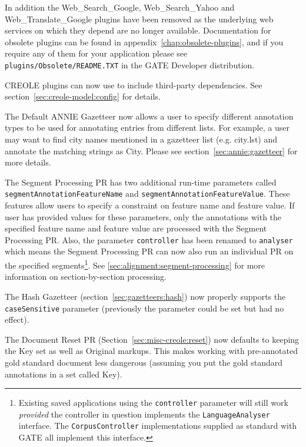 In addition the Web\_Search\_Google, Web\_Search\_Yahoo and
Web\_Translate\_Google plugins have been removed as the underlying web services
on which they depend are no longer available.  Documentation for obsolete
plugins can be found in appendix~\ref{chap:obsolete-plugins}, and if you
require any of them for your application please see
\verb|plugins/Obsolete/README.TXT| in the GATE Developer distribution.


CREOLE plugins can now use  to
include third-party dependencies. See section~\ref{sec:creole-model:config} for details.

The Default ANNIE Gazetteer now allows a user to specify different annotation
types to be used for annotating entries from different lists. For example, a
user may want to find city names mentioned in a gazetteer list (e.g. city.lst)
and annotate the matching strings as City. Please see
section~\ref{sec:annie:gazetteer} for more details.

The Segment Processing PR has two additional run-time parameters called
\texttt{segmentAnnotationFeatureName} and
\texttt{segmentAnnotationFeatureValue}.  These features allow users to specify
a constraint on feature name and feature value.  If user has provided values
for these parameters, only the annotations with the specified feature name and
feature value are processed with the Segment Processing PR.  Also, the
parameter \texttt{controller} has been renamed to \texttt{analyser} which means
the Segment Processing PR can now also run an individual PR on the specified
segments\footnote{Existing saved applications using the \texttt{controller}
parameter will still work \emph{provided} the controller in question implements
the \texttt{LanguageAnalyser} interface.  The \texttt{CorpusController}
implementations supplied as standard with GATE all implement this interface.}.
See \ref{sec:alignment:segment-processing} for more information on
section-by-section processing.

The Hash Gazetteer (section~\ref{sec:gazetteers:hash}) now properly supports
the \texttt{caseSensitive} parameter (previously the parameter could be set but
had no effect).

The Document Reset PR (Section~\ref{sec:misc-creole:reset}) now defaults to
keeping the Key set as well as Original markups. This makes working with
pre-annotated gold standard document less dangerous (assuming you put the gold
standard annotations in a set called Key).

